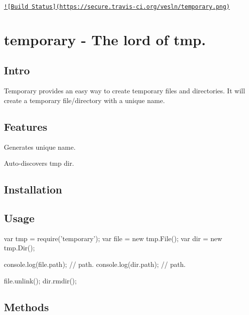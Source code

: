 \href{http://travis-ci.org/vesln/temporary}{\tt !\mbox{[}Build Status\mbox{]}(https\+://secure.\+travis-\/ci.\+org/vesln/temporary.\+png)}

\section*{temporary -\/ The lord of tmp.}

\subsection*{Intro}

Temporary provides an easy way to create temporary files and directories. It will create a temporary file/directory with a unique name.

\subsection*{Features}


\begin{DoxyItemize}
\item Generates unique name.
\item Auto-\/discovers tmp dir.
\end{DoxyItemize}

\subsection*{Installation}



\subsection*{Usage}

\begin{DoxyVerb}var tmp = require('temporary');
var file = new tmp.File();
var dir = new tmp.Dir();

console.log(file.path); // path.
console.log(dir.path); // path.

file.unlink();
dir.rmdir();
\end{DoxyVerb}


\subsection*{Methods}

